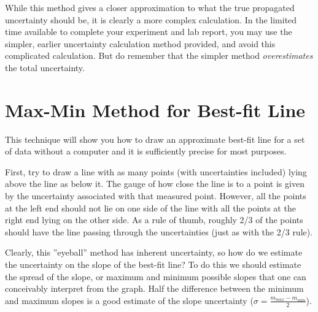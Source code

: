 \documentclass[letterpaper, 12pt]{book}
\newcommand{\myskip}{\vspace{0.5\baselineskip}}
\begin{document}
While this method gives a closer approximation to what the true propagated uncertainty should be, it is clearly a more complex calculation.  In the limited time available to complete your experiment and lab report, you may use the simpler, earlier uncertainty calculation method provided, and avoid this complicated calculation.  But do remember that the simpler method \emph{overestimates} the total uncertainty.

\section{Max-Min Method for Best-fit Line}

This technique will show you how to draw an approximate best-fit line for a  set of data without a computer and it is sufficiently precise for most purposes.

First, try to draw a line with as many points (with uncertainties included) lying above the line as below it. The gauge of how close the line is to a point is given by the uncertainty associated with that measured point. However, all the points at the left end should not lie on one side of the line with all the points at the right end lying on the other side. As a rule of thumb, roughly 2/3 of the points should have the line passing through the uncertainties (just as with the 2/3 rule).\myskip

Clearly, this ''eyeball'' method has inherent uncertainty, so how do we estimate the uncertainty on the slope of the best-fit line? To do this we should estimate the spread of the slope, or maximum and minimum possible slopes that one can conceivably interpret from the graph. Half the difference between the minimum and maximum slopes is a good estimate of the slope uncertainty ($\sigma=\frac{m_{max}-m_{min}}{2}$).
\end{document}
